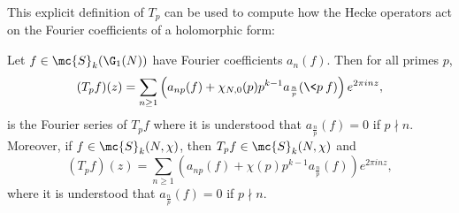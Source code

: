     This explicit definition of $T_{p}$ can be used to compute how the Hecke operators act on the Fourier coefficients of a holomorphic form:

    \begin{proposition}\label{prop:prime_Hecke_operators_acting_on_Fourier_coefficients_holomorphic}
      Let $f \in \mc{S}_{k}(\G_{1}(N))$ have Fourier coefficients $a_{n}(f)$. Then for all primes $p$,
      \[
        (T_{p}f)(z) = \sum_{n \ge 1}\left(a_{np}(f)+\chi_{N,0}(p)p^{k-1}a_{\frac{n}{p}}(\<p\>f)\right)e^{2\pi inz},
      \]
      is the Fourier series of $T_{p}f$ where it is understood that $a_{\frac{n}{p}}(f) = 0$ if $p \nmid n$. Moreover, if $f \in \mc{S}_{k}(N,\chi)$, then $T_{p}f \in \mc{S}_{k}(N,\chi)$ and
      \[
        (T_{p}f)(z) = \sum_{n \ge 1}\left(a_{np}(f)+\chi(p)p^{k-1}a_{\frac{n}{p}}(f)\right)e^{2\pi inz},
      \]
      where it is understood that $a_{\frac{n}{p}}(f) = 0$ if $p \nmid n$.
    \end{proposition}
